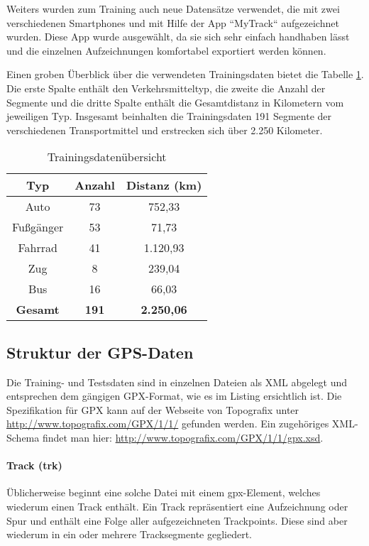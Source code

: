 Weiters wurden zum Training auch neue Datensätze verwendet, die mit zwei verschiedenen Smartphones und mit Hilfe der App ``MyTrack`` aufgezeichnet wurden. Diese App wurde ausgewählt, da sie sich sehr einfach handhaben lässt und die einzelnen Aufzeichnungen komfortabel exportiert werden können. 

Einen groben Überblick über die verwendeten Trainingsdaten bietet die Tabelle \ref{datenuebsicht}. Die erste Spalte enthält den Verkehrsmitteltyp, die zweite die Anzahl der Segmente  und die dritte Spalte enthält die Gesamtdistanz in Kilometern vom jeweiligen Typ. Insgesamt beinhalten die Trainingsdaten 191 Segmente der verschiedenen Transportmittel und erstrecken sich über 2.250 Kilometer.

\begin{table}
\centering
\begin{tabular}{| c | c | c | }
\hline
\textbf{Typ} & \textbf{Anzahl} & \textbf{Distanz (km)}\\ 
\hline
Auto & 73 & 752,33\\
\hline
Fußgänger &	53 & 71,73\\
\hline
Fahrrad	& 41 & 1.120,93\\
\hline
Zug & 8 & 239,04\\
\hline
Bus	& 16 & 66,03\\
\hline
\textbf{Gesamt} & \textbf{191} & \textbf{2.250,06}\\
\hline
\end{tabular}
\caption{Trainingsdatenübersicht}
\label{datenuebsicht}
\end{table}

\subsection*{Struktur der GPS-Daten}
Die Training- und Testsdaten sind in einzelnen Dateien als XML abgelegt und entsprechen dem gängigen GPX-Format, wie es im Listing  ersichtlich ist. Die Spezifikation für GPX kann auf der Webseite von Topografix unter \url{ http://www.topografix.com/GPX/1/1/} gefunden werden. Ein zugehöriges XML-Schema findet man hier: \url{http://www.topografix.com/GPX/1/1/gpx.xsd}. \cite{topografix_gpx_2004} 

\paragraph{Track (trk)}
Üblicherweise beginnt eine solche Datei mit einem gpx-Element, welches wiederum einen Track enthält. Ein Track repräsentiert eine Aufzeichnung oder Spur und enthält eine Folge aller aufgezeichneten Trackpoints. Diese sind aber wiederum in ein oder mehrere Tracksegmente gegliedert. \cite{topografix_gpx_2004}

